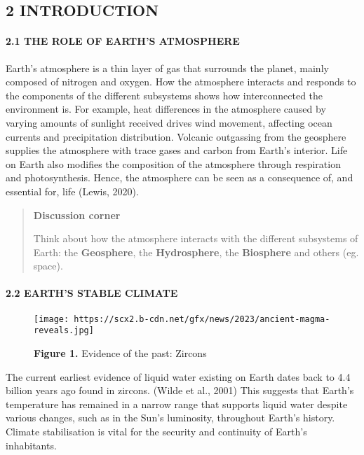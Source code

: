\documentclass[
  letterpaper,
  DIV=11,
  numbers=noendperiod]{scrartcl}
\let\oldparagraph\paragraph
\renewcommand{\paragraph}[1]{\oldparagraph{#1}\mbox{}}
\begin{document}
\hypertarget{introduction}{%
\subsection{2 \textbar{} INTRODUCTION}\label{introduction}}

\hypertarget{the-role-of-earths-atmosphere}{%
\paragraph{2.1 THE ROLE OF EARTH'S
ATMOSPHERE}\label{the-role-of-earths-atmosphere}}

Earth's atmosphere is a thin layer of gas that surrounds the planet,
mainly composed of nitrogen and oxygen. How the atmosphere interacts and
responds to the components of the different subsystems shows how
interconnected the environment is. For example, heat differences in the
atmosphere caused by varying amounts of sunlight received drives wind
movement, affecting ocean currents and precipitation distribution.
Volcanic outgassing from the geosphere supplies the atmosphere with
trace gases and carbon from Earth's interior. Life on Earth also
modifies the composition of the atmosphere through respiration and
photosynthesis. Hence, the atmosphere can be seen as a consequence of,
and essential for, life (Lewis, 2020).

\begin{quote}
\textbf{Discussion corner}

Think about how the atmosphere interacts with the different subsystems
of Earth: the \textbf{Geosphere}, the \textbf{Hydrosphere}, the
\textbf{Biosphere} and others (eg. space).
\end{quote}

\hypertarget{earths-stable-climate}{%
\paragraph{2.2 EARTH'S STABLE CLIMATE}\label{earths-stable-climate}}

\begin{figure}

{\centering \texttt{[image: https://scx2.b-cdn.net/gfx/news/2023/ancient-magma-reveals.jpg]}

}

\caption{\textbf{Figure 1.} Evidence of the past: Zircons}

\end{figure}

The current earliest evidence of liquid water existing on Earth dates
back to 4.4 billion years ago found in zircons. (Wilde et al., 2001)
This suggests that Earth's temperature has remained in a narrow range
that supports liquid water despite various changes, such as in the Sun's
luminosity, throughout Earth's history. Climate stabilisation is vital
for the security and continuity of Earth's inhabitants.
\end{document}
